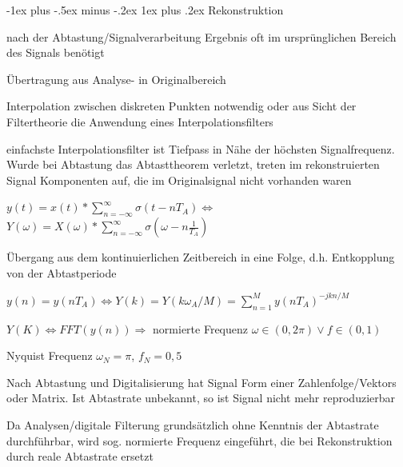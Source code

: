 \documentclass[a4paper]{article}
\makeatletter
\renewcommand{\subsubsection}{\@startsection{subsubsection}{3}{0mm}%
 {-1ex plus -.5ex minus -.2ex}%
 {1ex plus .2ex}%
 {\normalfont\small\bfseries}}
\makeatother
\begin{document}
\begin{multicols}{3}
  \subsubsection{Rekonstruktion}
  \begin{itemize*}
    \item nach der Abtastung/Signalverarbeitung Ergebnis oft im ursprünglichen Bereich des Signals benötigt
    \item Übertragung aus Analyse- in Originalbereich
    \item Interpolation zwischen diskreten Punkten notwendig oder aus Sicht der Filtertheorie die Anwendung eines Interpolationsfilters
    \item einfachste Interpolationsfilter ist Tiefpass in Nähe der höchsten Signalfrequenz. Wurde bei Abtastung das Abtasttheorem verletzt, treten im rekonstruierten Signal Komponenten auf, die im Originalsignal nicht vorhanden waren
  \end{itemize*}
  \begin{itemize*}
    \item $y(t)=x(t)*\sum^{\infty}_{n=-\infty} \sigma(t-nT_A) \Leftrightarrow$ $Y(\omega)=X(\omega)*\sum^{\infty}_{n=-\infty}\sigma(\omega-n\frac{1}{T_A})$
    \item Übergang aus dem kontinuierlichen Zeitbereich in eine Folge, d.h. Entkopplung von der Abtastperiode
    \item $y(n)=y(nT_A) \Leftrightarrow Y(k)=Y(k\omega_A/M)=\sum_{n=1}^M y(nT_A)^{-jkn/M}$
    \item $Y(K)\Leftrightarrow FFT(y(n))\Rightarrow$ normierte Frequenz $\omega\in(0,2\pi)\vee f\in(0,1)$
    \item Nyquist Frequenz $\omega_N=\pi$, $f_N=0,5$
    \item Nach Abtastung und Digitalisierung hat Signal Form einer Zahlenfolge/Vektors oder Matrix. Ist Abtastrate unbekannt, so ist Signal nicht mehr reproduzierbar
    \item Da Analysen/digitale Filterung grundsätzlich ohne Kenntnis der Abtastrate durchführbar, wird sog. normierte Frequenz eingeführt, die bei Rekonstruktion durch reale Abtastrate ersetzt
  \end{itemize*}


\end{multicols}
\end{document}
